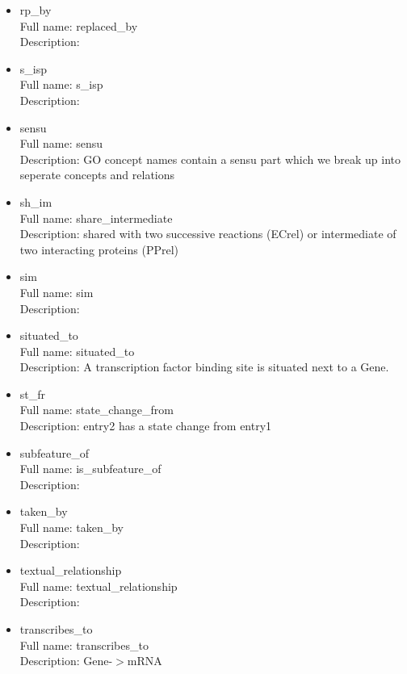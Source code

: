 \begin{itemize}
\item{rp\_by}\\ Full name: replaced\_by\\ Description: 

\item{s\_isp}\\ Full name: s\_isp\\ Description: 

\item{sensu}\\ Full name: sensu\\ Description: GO concept names contain a sensu part which we break up into seperate concepts and relations 

\item{sh\_im}\\ Full name: share\_intermediate\\ Description: shared with two successive reactions (ECrel) or intermediate of two interacting proteins (PPrel) 

\item{sim}\\ Full name: sim\\ Description: 

\item{situated\_to}\\ Full name: situated\_to\\ Description: A transcription factor binding site is situated next to a Gene. 

\item{st\_fr}\\ Full name: state\_change\_from\\ Description: entry2 has a state change from entry1 

\item{subfeature\_of}\\ Full name: is\_subfeature\_of\\ Description: 

\item{taken\_by}\\ Full name: taken\_by\\ Description: 

\item{textual\_relationship}\\ Full name: textual\_relationship\\ Description: 

\item{transcribes\_to}\\ Full name: transcribes\_to\\ Description: Gene-$>$mRNA 


\end{itemize}

